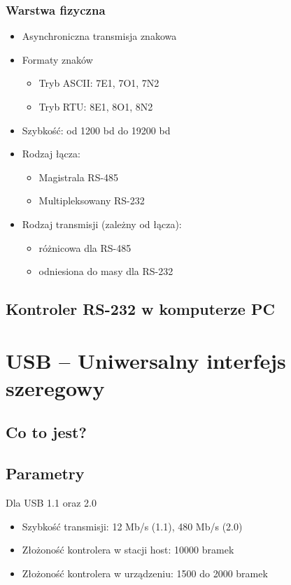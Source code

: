 \documentclass[a4paper,twoside]{article}
\begin{document}
		\subsubsection{Warstwa fizyczna}
		\begin{itemize}
			\item Asynchroniczna transmisja znakowa
			\item Formaty znaków
			\begin{itemize}
				\item Tryb ASCII: 7E1, 7O1, 7N2
				\item Tryb RTU: 8E1, 8O1, 8N2
			\end{itemize}
			\item Szybkość: od 1200 bd do 19200 bd
			\item Rodzaj łącza:
			\begin{itemize}
				\item Magistrala RS-485
				\item Multipleksowany RS-232
			\end{itemize}
			\item Rodzaj transmisji (zależny od łącza):
			\begin{itemize}
				\item różnicowa dla RS-485
				\item odniesiona do masy dla RS-232
			\end{itemize}
		\end{itemize}
	\subsection{Kontroler RS-232 w komputerze PC}
	
\section{USB – Uniwersalny interfejs szeregowy}
	\subsection{Co to jest?}
	\subsection{Parametry}
	Dla USB 1.1 oraz 2.0
	\begin{itemize}
		\item Szybkość transmisji: 12 Mb/s (1.1), 480 Mb/s (2.0)
		\item Złożoność kontrolera w stacji host: 10000 bramek
		\item Złożoność kontrolera w urządzeniu: 1500 do 2000 bramek
	\end{itemize}
\end{document}
